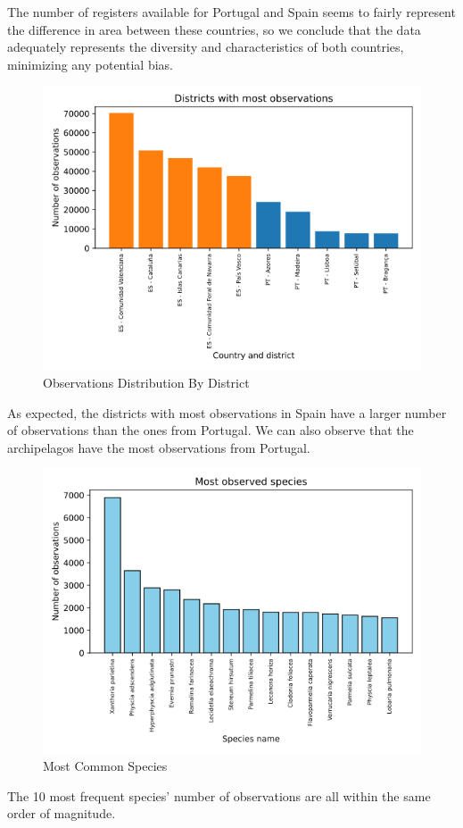The number of registers available for Portugal and Spain seems to fairly represent the difference in area between these countries, so we conclude that the data adequately represents the diversity and characteristics of both countries, minimizing any potential bias.

\begin{figure}[H]
    \centering
    \includegraphics[width=0.6\linewidth]{figures/district_observations.png}
    \caption{Observations Distribution By District}
\end{figure}

As expected, the districts with most observations in Spain have a larger number of observations than the ones from Portugal. We can also observe that the archipelagos have the most observations from Portugal. 

\begin{figure}[H]
    \centering
    \includegraphics[width=0.6\linewidth]{figures/species_observations.png}
    \caption{Most Common Species}
\end{figure}

The 10 most frequent species' number of observations are all within the same order of magnitude.
